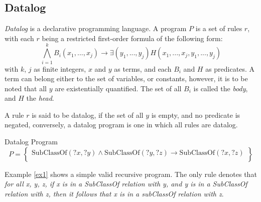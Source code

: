 \subsection{Datalog}

\textit{Datalog}\cite{all_you_ever_wanted_to_ask} is a declarative programming language. A program $P$ is a set of
rules $r$, with each $r$ being a restricted first-order formula of the following form: \[\bigwedge_{i=1}^kB_i(x_1, ..., x_j) \rightarrow \exists (y_1, ..., y_j)H(x_1, ..., x_j, y_1, ..., y_j)\]
with $k$, $j$ as finite integers, $x$ and $y$ as terms, and each $B_i$ and $H$ as predicates. A term can belong
either to the set of variables, or constants, however, it is to be noted that all $y$ are existentially quantified.
The set of all $B_i$ is called the \textit{body}, and $H$ the \textit{head}.

A rule $r$ is said to be datalog, if the set of all $y$ is empty, and no predicate is negated, conversely, a
datalog program is one in which all rules are datalog.
\begin{exmp}{Datalog Program}\label{ex1}
	\[
		P = \left\{  \begin{array}{l}
			\text{SubClassOf}(?x, ?y) \wedge \text{SubClassOf}(?y, ?z) \rightarrow \text{SubClassOf}(?x, ?z) \\
		\end{array}\right\}
	\]
\end{exmp}
Example \ref{ex1} shows a simple valid recursive program. The only rule denotes that \textit{for all x, y, z, if x is
	in a SubClassOf relation with y, and y is in a SubClassOf relation with z, then it follows that x is in a subClassOf
	relation with z}.

